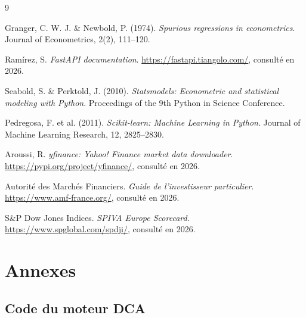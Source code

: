 \documentclass[11pt,a4paper]{article}
\begin{document}
\begin{thebibliography}{9}

Granger, C. W. J. \& Newbold, P. (1974).
\textit{Spurious regressions in econometrics}.
Journal of Econometrics, 2(2), 111--120.

Ramírez, S. \textit{FastAPI documentation}.
\url{https://fastapi.tiangolo.com/}, consulté en 2026.

Seabold, S. \& Perktold, J. (2010).
\textit{Statsmodels: Econometric and statistical modeling with Python}.
Proceedings of the 9th Python in Science Conference.

Pedregosa, F. et al. (2011).
\textit{Scikit-learn: Machine Learning in Python}.
Journal of Machine Learning Research, 12, 2825--2830.

Aroussi, R. \textit{yfinance: Yahoo! Finance market data downloader}.
\url{https://pypi.org/project/yfinance/}, consulté en 2026.

Autorité des Marchés Financiers. \textit{Guide de l'investisseur particulier}.
\url{https://www.amf-france.org/}, consulté en 2026.

S\&P Dow Jones Indices. \textit{SPIVA Europe Scorecard}.
\url{https://www.spglobal.com/spdji/}, consulté en 2026.

\end{thebibliography}

\appendix
\section{Annexes}
\label{annexe:code}

\subsection{Code du moteur DCA}
\end{document}
